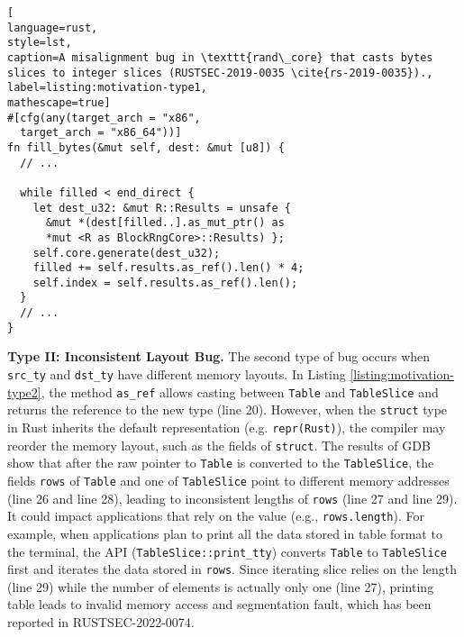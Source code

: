
\begin{lstlisting}[
language=rust, 
style=lst,
caption=A misalignment bug in \texttt{rand\_core} that casts bytes slices to integer slices (RUSTSEC-2019-0035 \cite{rs-2019-0035}).,
label=listing:motivation-type1,
mathescape=true]
#[cfg(any(target_arch = "x86",
  target_arch = "x86_64"))]
fn fill_bytes(&mut self, dest: &mut [u8]) {
  // ...

  while filled < end_direct {
    let dest_u32: &mut R::Results = unsafe { 
      &mut *(dest[filled..].as_mut_ptr() as 
      *mut <R as BlockRngCore>::Results) };
    self.core.generate(dest_u32);
    filled += self.results.as_ref().len() * 4;
    self.index = self.results.as_ref().len();
  }
  // ...
}
\end{lstlisting}




\vspace{0.05in}
\noindent\textbf{Type II: Inconsistent Layout Bug.} \label{motiv:bugII} The second type of bug occurs when \texttt{src\_ty} and \texttt{dst\_ty} have different memory layouts. 
%
In Listing \ref{listing:motivation-type2}, the method \texttt{as\_ref} allows casting between \texttt{Table} and \texttt{TableSlice} and returns the reference to the new type (line 20). 
%
However, when the \texttt{struct} type in Rust inherits the default representation (e.g. \texttt{repr(Rust)}), the compiler may reorder the memory layout, such as the fields of \texttt{struct}. 
%
The results of GDB show that after the raw pointer to \texttt{Table} is converted to the \texttt{TableSlice}, the fields \texttt{rows} of \texttt{Table} and one of \texttt{TableSlice} point to different memory addresses (line 26 and line 28), leading to inconsistent lengths of \texttt{rows} (line 27 and line 29).
%
It could impact applications that rely on the value (e.g., \texttt{rows.length}). 
For example, when applications plan to print all the data stored in table format to the terminal, the API (\texttt{TableSlice::print\_tty}) converts \texttt{Table} to \texttt{TableSlice} first and iterates the data stored in \texttt{rows}. 
%
Since iterating slice relies on the length (line 29) while the number of elements is actually only one (line 27), printing table leads to invalid memory access and segmentation fault, which has been reported in RUSTSEC-2022-0074.



